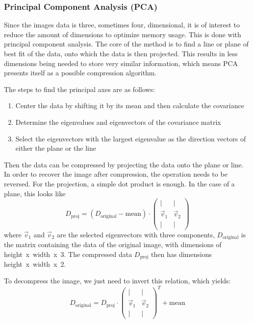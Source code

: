 \subsubsection{Principal Component Analysis (PCA)}
Since the images data is three, sometimes four, dimensional, it is of interest to reduce the amount of dimensions to optimize memory usage. This is done with principal component analysis. The core of the method is to find a line or plane of best fit of the data, onto which the data is then projected. This results in less dimensions being needed to store very similar information, which means PCA presents itself as a possible compression algorithm. 

The steps to find the principal axes are as follows:
\begin{enumerate}
    \item Center the data by shifting it by its mean and then calculate the covariance
    \item Determine the eigenvalues and eigenvectors of the covariance matrix
    \item Select the eigenvectors with the largest eigenvalue as the direction vectors of either the plane or the line
\end{enumerate}

Then the data can be compressed by projecting the data onto the plane or line. In order to recover the image after compression, the operation needs to be reversed. For the projection, a simple dot product is enough. In the case of a plane, this looks like
\begin{equation}
    D_\mathrm{proj} = (D_\mathrm{original} - \mathrm{mean} ) \cdot \begin{pmatrix}
        | & | \\
        \vec{v}_1 & \vec{v}_2 \\
        | & | 
    \end{pmatrix}
\end{equation}
where $\vec{v}_1$ and $\vec{v}_2$ are the selected eigenvectors with three components, $D_\mathrm{original}$ is the matrix containing the data of the original image, with dimensions of height~x~width~x~3. The compressed data $D_\mathrm{proj}$ then has dimensions height~x~width~x~2.

To decompress the image, we just need to invert this relation, which yields:
\begin{equation}
    D_\mathrm{original} = D_\mathrm{proj} \cdot \begin{pmatrix}
        | & | \\
        \vec{v}_1 & \vec{v}_2 \\
        | & | 
    \end{pmatrix}^T + \mathrm{mean} 
\end{equation}

